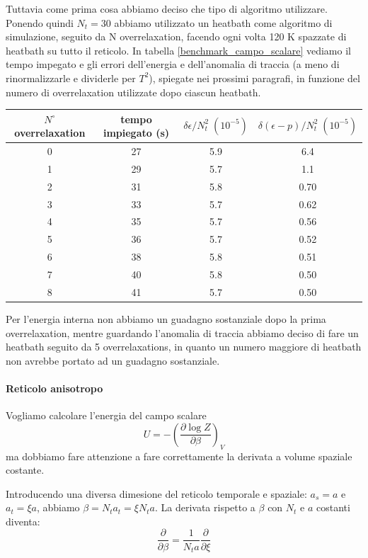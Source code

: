 \documentclass[a4paper, 12pt]{article}
\begin{document}
Tuttavia come prima cosa abbiamo deciso che tipo di algoritmo utilizzare.
Ponendo quindi $N_t=30$ abbiamo utilizzato un heatbath come algoritmo di simulazione,
seguito da N overrelaxation, facendo ogni volta 120 K spazzate di heatbath
su tutto il reticolo. In tabella \ref{benchmark_campo_scalare} vediamo
il tempo impegato e gli errori dell'energia e dell'anomalia di traccia (a meno
di rinormalizzarle e dividerle per $T^2$),
spiegate nei prossimi paragrafi, in funzione del numero di overrelaxation
utilizzate dopo ciascun heatbath.

\begin{center}
\begin{tabular}{ c | c | c | c }
\label{benchmark_campo_scalare}
$N^{\circ}$ overrelaxation & tempo impiegato (s) &
$\delta \epsilon / N_t ^ 2 \; (10^{-5})$ &
$\delta (\epsilon - p) / N_t ^ 2 \; (10^{-5})$ \\
\hline
0 & 27 & 5.9 & 6.4 \\
1 & 29 & 5.7 & 1.1 \\
2 & 31 & 5.8 & 0.70 \\
3 & 33 & 5.7 & 0.62 \\
4 & 35 & 5.7 & 0.56 \\
5 & 36 & 5.7 & 0.52 \\
6 & 38 & 5.8 & 0.51 \\
7 & 40 & 5.8 & 0.50 \\
8 & 41 & 5.7 & 0.50
\end{tabular}
\end{center}

Per l'energia interna non abbiamo un guadagno sostanziale dopo la prima
overrelaxation, mentre guardando l'anomalia di traccia abbiamo deciso di fare
un heatbath seguito da 5 overrelaxations, in quanto un numero maggiore di
heatbath non avrebbe portato ad un guadagno sostanziale.

\paragraph{Reticolo anisotropo}
Vogliamo calcolare l'energia del campo scalare
\begin{equation}
U=-\left(\frac{\partial \log Z}{\partial \beta} \right)_V
\end{equation}
ma dobbiamo fare attenzione a fare correttamente la derivata a volume spaziale
costante.

Introducendo una diversa dimesione del reticolo temporale e spaziale:
$a_s = a$ e $a_t = \xi a$, abbiamo $\beta = N_t a_t = \xi N_t a$.
La derivata rispetto a $\beta$ con $N_t$ e $a$ costanti diventa:
\begin{equation}
\frac{\partial}{\partial \beta} = \frac{1}{N_t a} \frac{\partial}{\partial \xi}
\end{equation}
\end{document}
